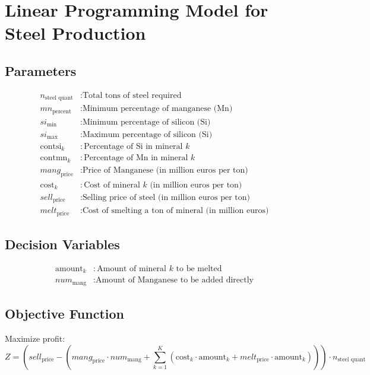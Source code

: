 \documentclass{article}
\begin{document}
\section*{Linear Programming Model for Steel Production}

\subsection*{Parameters}
\begin{align*}
n_{\text{steel quant}} & : \text{Total tons of steel required} \\
mn_{\text{percent}} & : \text{Minimum percentage of manganese (Mn)} \\
si_{\text{min}} & : \text{Minimum percentage of silicon (Si)} \\
si_{\text{max}} & : \text{Maximum percentage of silicon (Si)} \\
\text{contsi}_k & : \text{Percentage of Si in mineral } k \\
\text{contmn}_k & : \text{Percentage of Mn in mineral } k \\
mang_{\text{price}} & : \text{Price of Manganese (in million euros per ton)} \\
\text{cost}_k & : \text{Cost of mineral } k \text{ (in million euros per ton)} \\
sell_{\text{price}} & : \text{Selling price of steel (in million euros per ton)} \\
melt_{\text{price}} & : \text{Cost of smelting a ton of mineral (in million euros)}
\end{align*}

\subsection*{Decision Variables}
\begin{align*}
\text{amount}_k & : \text{Amount of mineral } k \text{ to be melted} \\
num_{\text{mang}} & : \text{Amount of Manganese to be added directly}
\end{align*}

\subsection*{Objective Function}
Maximize profit:
\[
Z = \left( sell_{\text{price}} - (mang_{\text{price}} \cdot num_{\text{mang}} + \sum_{k=1}^{K} \left( \text{cost}_k \cdot \text{amount}_k + melt_{\text{price}} \cdot \text{amount}_k \right)) \right) \cdot n_{\text{steel quant}}
\]
\end{document}
